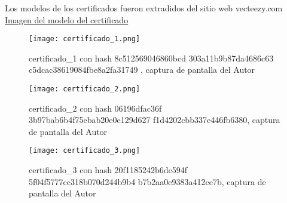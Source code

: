 
Los modelos de los certificados fueron extradidos del sitio web vecteezy.com \href{https://static.vecteezy.com/ti/vetor-gratis/p3/2252202-blue-and-gold-certificate-of-achievement-template-set-background-with-gold-badge-and-border-award-diploma-design-blank-vector-illustration-eps10-gr%C3%A1tis-vetor.jpg}{Imagen del modelo del certificado}
   \begin{figure}[H]
    \centering
    {\texttt{[image: certificado\_1.png]}}
    \caption{certificado\_1 con hash 8c512569046860bcd 303a11b9b87da4686c63 c5dcac38619084fbe8a2fa31749 , captura de pantalla del Autor}
    \label{img:certificado_1}
  \end{figure}

   \begin{figure}[H]
    \centering
    {\texttt{[image: certificado\_2.png]}}
    \caption{certificado\_2 con hash 06196dfac36f 3b97bab6b4f75ebab20e0e129d627 f1d4202cbb337e446fb6380, captura de pantalla del Autor}
    \label{img:certificado_2}
  \end{figure}

   \begin{figure}[H]
    \centering
    {\texttt{[image: certificado\_3.png]}}
    \caption{certificado\_3 con hash 20f1185242b6dc594f 5f04f5777cc318b070d244b9b4 b7b2aa0e9383a412ce7b, captura de pantalla del Autor}
    \label{img:certificado_3}
  \end{figure}

